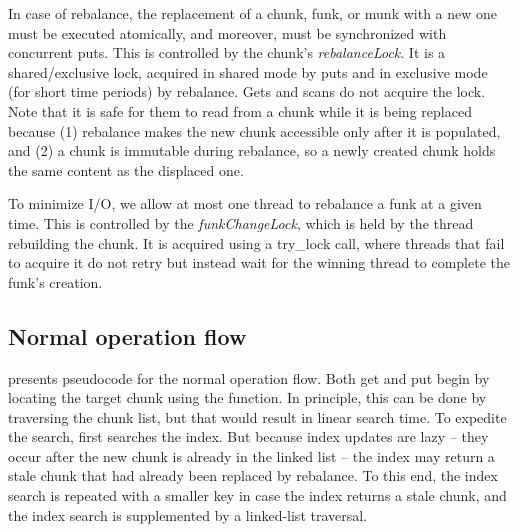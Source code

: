 In case of rebalance, the replacement of a chunk, funk, or munk with a new one
must be executed atomically, and moreover, must be synchronized with concurrent puts. 
This is controlled by the chunk's \emph{rebalanceLock}.
It is a shared/exclusive lock, acquired in shared mode by puts and in exclusive mode (for short time periods)
by rebalance. 
Gets and scans do not acquire the lock. Note that it is safe for them to read from a chunk while it is being replaced because
(1) rebalance makes the new chunk accessible only after it is populated, and (2) a chunk is immutable during rebalance, so 
a newly created chunk holds the same content as the displaced one.

To minimize I/O, we allow at most one thread to rebalance a funk at a given time. This is controlled by 
the  \emph{funkChangeLock}, which is held by the thread rebuilding the  chunk. 
It is acquired using a try\_lock call, where threads that fail to acquire it do not retry but instead wait for the winning thread to complete the funk's creation.

\subsection{Normal operation flow}
\label{ssec:ops}



  presents pseudocode for the normal operation flow. %
Both get and put begin by locating the target chunk using the  function. In principle, this can be done by traversing the chunk list, but that would result in linear search time. To expedite the search,    first searches the index. But because index updates are lazy -- they occur after the new chunk is already
in the linked list --  the index may return a stale chunk that had already been replaced by rebalance. To this end, the index search is repeated with a smaller key in case the index returns a stale chunk, and the index search is supplemented by a linked-list traversal. 


